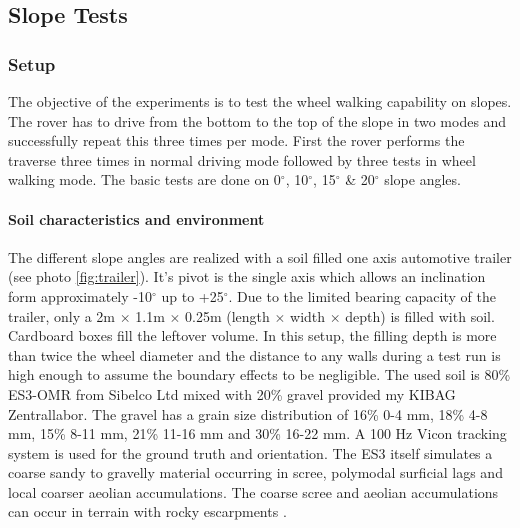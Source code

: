 \documentclass[a4paper,twocolumn]{esapub2005} %
\begin{document}
\subsection{Slope Tests}

\subsubsection{Setup}
The objective of the experiments is to test the wheel walking capability on slopes. The rover has to drive from the bottom to the top of the slope in two modes and successfully repeat this three times per mode. First the rover performs the traverse three times in normal driving mode followed by three tests in wheel walking mode. The basic tests are done on 0$^{\circ}$, 10$^{\circ}$, 15$^{\circ}$ \& 20$^{\circ}$ slope angles. 

\paragraph{Soil characteristics and environment}
The different slope angles are realized with a soil filled one axis automotive trailer (see photo \ref{fig:trailer}). It's pivot is the single axis which allows an inclination form approximately -10$^{\circ}$ up to +25$^{\circ}$. Due to the limited bearing capacity of the trailer, only a 2m $\times$ 1.1m $\times$ 0.25m (length $\times$ width $\times$ depth) is filled with soil. Cardboard boxes fill the leftover volume. In this setup, the filling depth is more than twice the wheel diameter and the distance to any walls during a test run is high enough to assume  the boundary effects to be negligible. 
The used soil is 80\% ES3-OMR from Sibelco Ltd mixed with 20\% gravel provided my KIBAG Zentrallabor. The gravel has a grain size distribution of 16\% 0-4 mm, 18\% 4-8 mm, 15\% 8-11 mm, 21\% 11-16 mm and 30\% 16-22 mm.
A 100 Hz Vicon tracking system is used for the ground truth and orientation. The ES3 itself simulates a coarse sandy to gravelly material occurring in scree, polymodal surficial lags and local coarser aeolian accumulations. The coarse scree and aeolian accumulations can occur in terrain with rocky escarpments \cite{michaud2014}.


\end{document}
